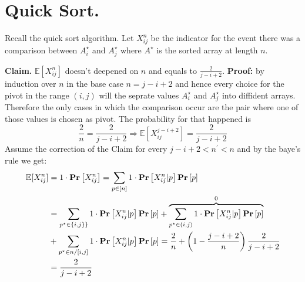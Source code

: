 \newpage{}

\section{Quick Sort.}

Recall the quick sort algorithm. Let \(X^{n}_{ij}\) be the indicator for the event there was a comparison between \(A^{\star}_{i}\) and \(A^{\star}_{j}\) where \(A^{\star}\) is the sorted array at length \(n\). 

\textbf{Claim.} \( \mathbb{E}[X^{n}_{ij}]\) doesn't deepened on \(n\) and equals to \( \frac{2}{j-i + 2} \). \textbf{Proof:} by induction over \(n\) in the base case \(n = j-i+2\) and hence every choice for the pivot in the range \( (i,j) \) will the seprate values \(A^{\star}_{i}\) and \(A^{\star}_{j}\) into diffident arrays. Therefore the only cases in which the comparison occur are the pair where one of those values is chosen as pivot. The probability for that happened is \begin{equation*} \frac{2}{n} = \frac{2}{j-i +2} \Rightarrow  \mathbb{E}[X^{j-i+2}_{ij}] = \frac{2}{j-i +2} \end{equation*} Assume the correction of the Claim for every \(j-i+2 < n^\prime < n\) and by the baye's rule we get: 
\begin{equation*}
\begin{split}    \mathbb{E}[X^{n}_{ij}] &= 1\cdot\mathbf{Pr} \left[ {X^{n}_{ij}} \right] = \sum_{p\in [n]}{1\cdot\mathbf{Pr} \left[ {X^{n}_{ij}| p} \right]\mathbf{Pr} \left[ {p} \right]} \\ &= \sum_{p^{\star} \in \{i,j\} \}}{1\cdot\mathbf{Pr} \left[ {X^{n}_{ij}| p} \right]\mathbf{Pr} \left[ {p} \right]} +  \overset{0}{\overbrace{\sum_{p^{\star} \in (i,j) }{1\cdot\mathbf{Pr} \left[ {X^{n}_{ij}| p} \right]\mathbf{Pr} \left[ {p} \right]}}} \\ & + \sum_{p^{\star} \in n/[i,j] }{1\cdot\mathbf{Pr} \left[ {X^{n}_{ij}| p} \right]\mathbf{Pr} \left[ {p} \right]} = \frac{2}{n} + \left(1 - \frac{j-i+2}{n} \right)\frac{2}{j-i+2} \\ &= \frac{2}{j-i+2}
    \end{split}
\end{equation*}

